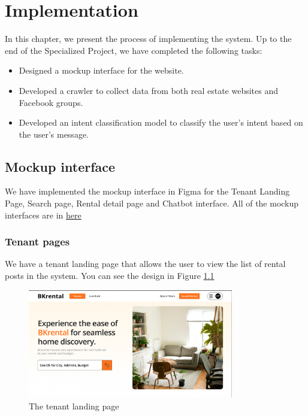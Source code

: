 \chapter{Implementation}
In this chapter, we present the process of implementing the system. Up to the end of the Specialized Project, we have completed the following tasks:
\begin{itemize}
    \item Designed a mockup interface for the website.
    \item Developed a crawler to collect data from both real estate websites and Facebook groups.
    \item Developed an intent classification model to classify the user's intent based on the user's message.
\end{itemize}

\section{Mockup interface}
We have implemented the mockup interface in Figma for the Tenant Landing Page, Search page, Rental detail page and Chatbot interface. All of the mockup interfaces are in \href{https://www.figma.com/proto/4W6eMgIgZQaSfi5h8Mn8Af/Material-UI-for-Figma-(and-MUI-X)-(Community)-(Copy)?page-id=4230%3A722&type=design&node-id=6609-8548&viewport=4481%2C1065%2C1&t=QoVk3s8CM7w3qcvh-1&scaling=scale-down-width&starting-point-node-id=6759%3A76810}{here}

\subsection{Tenant pages}
We have a tenant landing page that allows the user to view the list of rental posts in the system. You can see the design in Figure \ref{fig:tenant-landing-page}

\clearpage
\begin{figure}[ht]
    \centering
    \includegraphics[width=0.8\textwidth]{Images/Mockup/landing_page.png}
    \caption{The tenant landing page}
    \label{fig:tenant-landing-page}
\end{figure}

